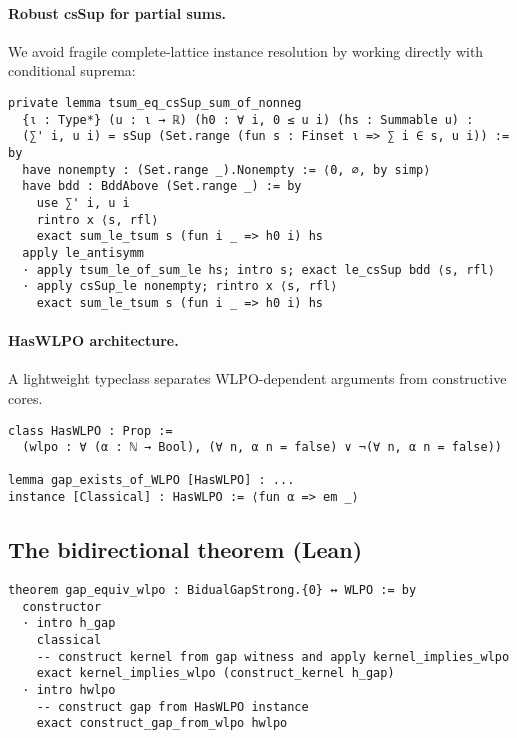 \documentclass[11pt]{article}  %
\begin{document}
\paragraph{Robust csSup for partial sums.}
We avoid fragile complete-lattice instance resolution by working directly with conditional suprema:
\begin{lstlisting}[caption={tsum equals csSup of finite partial sums}]
private lemma tsum_eq_csSup_sum_of_nonneg
  {ι : Type*} (u : ι → ℝ) (h0 : ∀ i, 0 ≤ u i) (hs : Summable u) :
  (∑' i, u i) = sSup (Set.range (fun s : Finset ι => ∑ i ∈ s, u i)) := by
  have nonempty : (Set.range _).Nonempty := ⟨0, ∅, by simp⟩
  have bdd : BddAbove (Set.range _) := by
    use ∑' i, u i
    rintro x ⟨s, rfl⟩
    exact sum_le_tsum s (fun i _ => h0 i) hs
  apply le_antisymm
  · apply tsum_le_of_sum_le hs; intro s; exact le_csSup bdd ⟨s, rfl⟩
  · apply csSup_le nonempty; rintro x ⟨s, rfl⟩
    exact sum_le_tsum s (fun i _ => h0 i) hs
\end{lstlisting}

\paragraph{HasWLPO architecture.}
A lightweight typeclass separates WLPO-dependent arguments from constructive cores.

\begin{lstlisting}[caption={WLPO typeclass sketch}]
class HasWLPO : Prop :=
  (wlpo : ∀ (α : ℕ → Bool), (∀ n, α n = false) ∨ ¬(∀ n, α n = false))

lemma gap_exists_of_WLPO [HasWLPO] : ...
instance [Classical] : HasWLPO := ⟨fun α => em _⟩
\end{lstlisting}

\subsection{The bidirectional theorem (Lean)}

\begin{lstlisting}[caption={WLPO ↔ Gap (top-level equivalence)}]
theorem gap_equiv_wlpo : BidualGapStrong.{0} ↔ WLPO := by
  constructor
  · intro h_gap
    classical
    -- construct kernel from gap witness and apply kernel_implies_wlpo
    exact kernel_implies_wlpo (construct_kernel h_gap)
  · intro hwlpo
    -- construct gap from HasWLPO instance
    exact construct_gap_from_wlpo hwlpo
\end{lstlisting}

\end{document}
